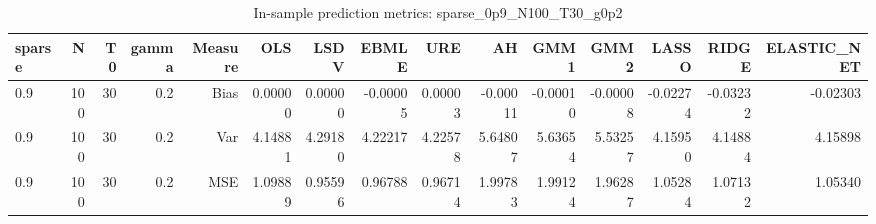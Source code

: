 \begin{table}[!htbp]\centering
\caption{In-sample prediction metrics: sparse_0p9_N100_T30_g0p2}
\label{tab:table2_sparse_0p9_N100_T30_g0p2}
\begin{tabular}{lrrrrrrrrrrrrrr}
\hline
sparse & N & T0 & gamma & Measure & OLS & LSDV & EBMLE & URE & AH & GMM1 & GMM2 & LASSO & RIDGE & ELASTIC_NET \\
\hline
0.9 & 100 & 30 & 0.2 & Bias & 0.00000 & 0.00000 & -0.00005 & 0.00003 & -0.00011 & -0.00010 & -0.00008 & -0.02274 & -0.03232 & -0.02303 \\
0.9 & 100 & 30 & 0.2 & Var & 4.14881 & 4.29180 & 4.22217 & 4.22578 & 5.64807 & 5.63654 & 5.53257 & 4.15950 & 4.14884 & 4.15898 \\
0.9 & 100 & 30 & 0.2 & MSE & 1.09889 & 0.95596 & 0.96788 & 0.96714 & 1.99783 & 1.99124 & 1.96287 & 1.05284 & 1.07132 & 1.05340 \\
\hline
\end{tabular}
\end{table}

